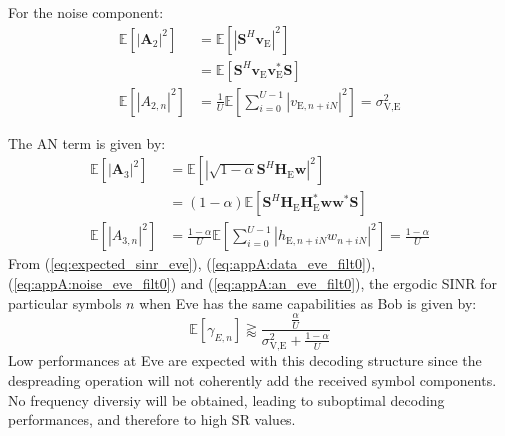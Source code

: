 \documentclass[journal,comsoc]{IEEEtran}
\newcommand{\module}[1]{\left|#1\right|}
\newcommand{\EX}[1]{\mathbb{E} \left[#1\right]}%
\newcommand{\HE}{\textbf{H}_{\text{E}}}
\newcommand{\ve}{\textbf{v}_{\text{E}}}
\newcommand{\spread}{\textbf{S}}
\newcommand{\w}{\textbf{w}}
\begin{document}
For the noise component:
\begin{equation}
	\begin{split}
	\EX{|\textbf{A}_{2}|^2} &=  \EX{\module{\spread^H \ve}^2} \\
	&=\EX{\spread^H \ve \ve^* \spread } \\
	\EX{|A_{2,n}|^2} &= \frac{1}{U} \EX{\sum_{i=0}^{U-1} |v_{\text{E}, n + iN}|^2} = \sigma^2_{\text{V,E}}
	\end{split}
	\label{eq:appA:noise_eve_filt0}
\end{equation}

The AN term is given by:
\begin{equation}
	\begin{split}
	\EX{|\textbf{A}_{3}|^2} &=  \EX{\module{\sqrt{1-\alpha}\spread^H \HE \w}^2} \\
	&=(1-\alpha)\EX{\spread^H \HE\textbf{H}^*_{\text{E}} \w\w^* \spread } \\
	\EX{|A_{3,n}|^2}  &= \frac{1-\alpha}{U} \EX{\sum_{i=0}^{U-1} |h_{\text{E}, n + iN}w_{n + iN}|^2} = \frac{1-\alpha}{U}
	\end{split}
	\label{eq:appA:an_eve_filt0}
\end{equation}
From (\ref{eq:expected_sinr_eve}), (\ref{eq:appA:data_eve_filt0}), (\ref{eq:appA:noise_eve_filt0}) and (\ref{eq:appA:an_eve_filt0}), the ergodic SINR for particular symbols $n$ when Eve has the same capabilities as Bob is given by:
\begin{equation}
\EX{\gamma_{E,n}} \gtrapprox \frac{\frac{\alpha}{U}}{\sigma^2_{\text{V,E}}+\frac{1-\alpha}{U}}
\label{eq:sinr_eve_filt0}
\end{equation}
Low performances at Eve are expected with this decoding structure since the despreading operation will not coherently add the received symbol components. No frequency diversiy will be obtained, leading to suboptimal decoding performances, and therefore to high SR values. 

\end{document}
